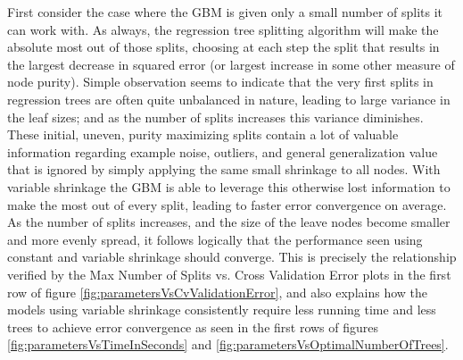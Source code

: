 \documentclass[9pt, conference]{IEEEtran}
\begin{document}
First consider the case where the GBM is given only a small number of splits it can work with. As always, the regression tree splitting algorithm will make the absolute most out of those splits, choosing at each step the split that results in the largest decrease in squared error (or largest increase in some other measure of node purity). Simple observation seems to indicate that the very first splits in regression trees are often quite unbalanced in nature, leading to large variance in the leaf sizes; and as the number of splits increases this variance diminishes. These initial, uneven, purity maximizing splits contain a lot of valuable information regarding example noise, outliers, and general generalization value that is ignored by simply applying the same small shrinkage to all nodes. With variable shrinkage the GBM is able to leverage this otherwise lost information to make the most out of every split, leading to faster error convergence on average. As the number of splits increases, and the size of the leave nodes become smaller and more evenly spread, it follows logically that the performance seen using constant and variable shrinkage should converge. This is precisely the relationship verified by the Max Number of Splits vs. Cross Validation Error plots in the first row of figure \ref{fig:parametersVsCvValidationError}, and also explains how the models using variable shrinkage consistently require less running time and less trees to achieve error convergence as seen in the first rows of figures \ref{fig:parametersVsTimeInSeconds} and \ref{fig:parametersVsOptimalNumberOfTrees}.
\end{document}
